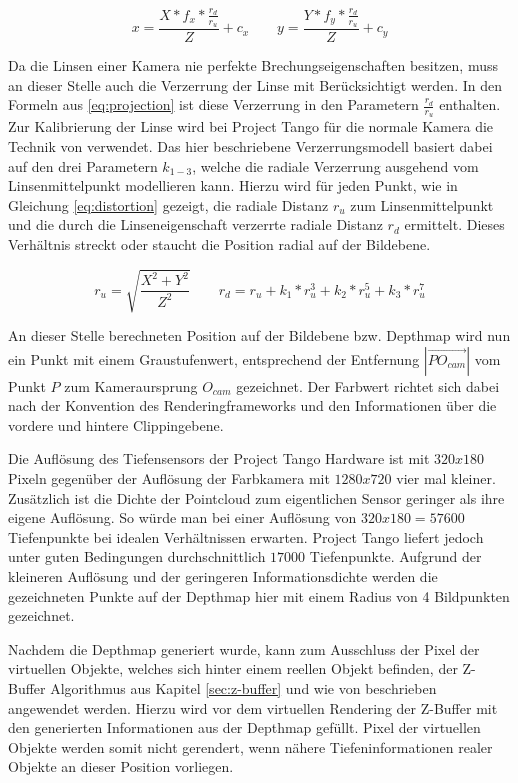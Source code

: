 \begin{equation}\label{eq:projection}
x = \frac{X* f_x * \frac{r_d}{r_u}}{Z}  + c_x
\qquad
y = \frac{Y* f_y * \frac{r_d}{r_u}}{Z}  + c_y
\end{equation}

Da die Linsen einer Kamera nie perfekte Brechungseigenschaften besitzen, muss an dieser Stelle auch die Verzerrung der Linse mit Berücksichtigt werden. In den Formeln aus \ref{eq:projection} ist diese Verzerrung in den Parametern \(\frac{r_d}{r_u}\) enthalten. Zur Kalibrierung der Linse wird bei Project Tango für die normale Kamera die Technik von \citet{tsai1987versatile} verwendet. Das hier beschriebene Verzerrungsmodell basiert dabei auf den drei Parametern \(k_{1-3}\), welche die radiale Verzerrung ausgehend vom Linsenmittelpunkt modellieren kann. Hierzu wird für jeden Punkt, wie in Gleichung \ref{eq:distortion} gezeigt, die radiale Distanz \(r_u\) zum Linsenmittelpunkt und die durch die Linseneigenschaft verzerrte radiale Distanz \(r_d\) ermittelt. Dieses Verhältnis streckt oder staucht die Position radial auf der Bildebene. \citep{Tango90:online}


\begin{equation} \label{eq:distortion}
r_u = \sqrt{\frac{X^2 + Y^2}{ Z^2}} 
\qquad
r_d = r_u + k_1 * r_u^3 + k_2 * r_u^5 + k_3 * r_u^7
\end{equation}

An dieser Stelle berechneten Position auf der Bildebene bzw. Depthmap wird nun ein Punkt mit einem Graustufenwert, entsprechend der Entfernung \(|\overrightarrow{PO_{cam}}|\) vom Punkt \(P\) zum Kameraursprung \(O_{cam}\) gezeichnet. Der Farbwert richtet sich dabei nach der Konvention des Renderingframeworks und den Informationen über die vordere und hintere Clippingebene.

Die Auflösung des Tiefensensors der Project Tango Hardware ist mit \(320x180\) Pixeln gegenüber der Auflösung der Farbkamera mit \(1280x720\) vier mal kleiner. Zusätzlich ist die Dichte der Pointcloud zum eigentlichen Sensor geringer als ihre eigene Auflösung. So würde man bei einer Auflösung von \(320x180 = 57600\) Tiefenpunkte bei idealen Verhältnissen erwarten. Project Tango liefert jedoch unter guten Bedingungen durchschnittlich \(17000\) Tiefenpunkte. Aufgrund der kleineren Auflösung und der geringeren Informationsdichte werden die gezeichneten Punkte auf der Depthmap hier mit einem Radius von 4 Bildpunkten gezeichnet. 

Nachdem die Depthmap generiert wurde, kann zum Ausschluss der Pixel der virtuellen Objekte, welches sich hinter einem reellen Objekt befinden, der Z-Buffer Algorithmus aus Kapitel \ref{sec:z-buffer} und wie von \citet{wloka1995resolving} beschrieben angewendet werden. Hierzu wird vor dem virtuellen Rendering der Z-Buffer mit den generierten Informationen aus der Depthmap gefüllt. Pixel der virtuellen Objekte werden somit nicht gerendert, wenn nähere Tiefeninformationen realer Objekte an dieser Position vorliegen. 


